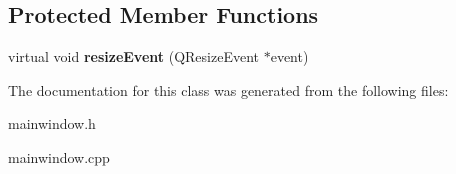 \subsection*{Protected Member Functions}
\begin{DoxyCompactItemize}
\item 
\hypertarget{classmainWindow_af635fe3be388d40f503801d57314958c}{
virtual void {\bfseries resizeEvent} (QResizeEvent $\ast$event)}
\label{classmainWindow_af635fe3be388d40f503801d57314958c}

\end{DoxyCompactItemize}


The documentation for this class was generated from the following files:\begin{DoxyCompactItemize}
\item 
mainwindow.h\item 
mainwindow.cpp\end{DoxyCompactItemize}
